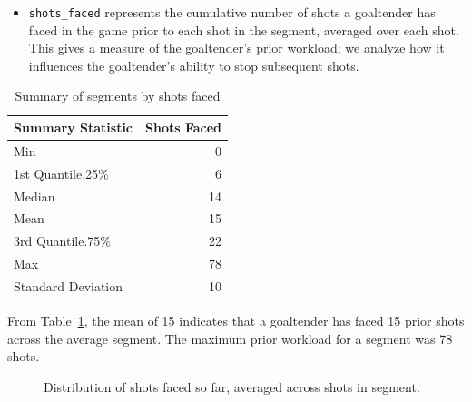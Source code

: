 \documentclass[
  letterpaper,
  DIV=11,
  numbers=noendperiod]{scrartcl}
\providecommand{\tightlist}{%
  \setlength{\itemsep}{0pt}\setlength{\parskip}{0pt}}\usepackage{longtable,booktabs,array}
\begin{document}
\begin{itemize}
\tightlist
\item
  \texttt{shots\_faced} represents the cumulative number of shots a
  goaltender has faced in the game prior to each shot in the segment,
  averaged over each shot. This gives a measure of the goaltender's
  prior workload; we analyze how it influences the goaltender's ability
  to stop subsequent shots.
\end{itemize}

\begin{longtable}[]{@{}lr@{}}

\caption{\label{tbl-6}Summary of segments by shots faced}

\tabularnewline

\toprule\noalign{}
Summary Statistic & Shots Faced \\
\midrule\noalign{}
\endhead
\bottomrule\noalign{}
\endlastfoot
Min & 0 \\
1st Quantile.25\% & 6 \\
Median & 14 \\
Mean & 15 \\
3rd Quantile.75\% & 22 \\
Max & 78 \\
Standard Deviation & 10 \\

\end{longtable}

From Table~\ref{tbl-6}, the mean of 15 indicates that a goaltender has
faced 15 prior shots across the average segment. The maximum prior
workload for a segment was 78 shots.

\begin{figure}


\caption{\label{fig-4}Distribution of shots faced so far, averaged
across shots in segment.}

\end{figure}%
\end{document}
